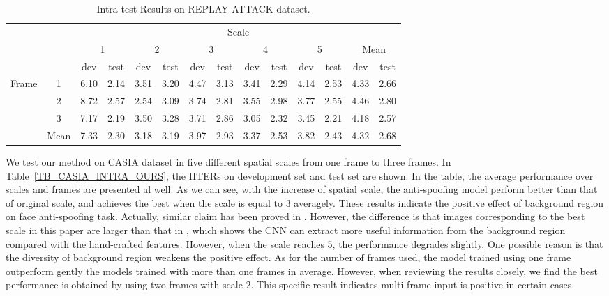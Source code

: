 \documentclass[letterpaper, 10 pt, conference]{ieeeconf}
\begin{document}
\begin{table*}[!htb]
\caption{Intra-test Results on REPLAY-ATTACK dataset.}
\label{TB_REPLAY_ATTACK_INTRA_OURS}
\centering
\begin{tabular}{|c|c|c|c|c|c|c|c|c|c|c|c||c|c|}
\cline{3-14}
\multicolumn{2}{c|}{}       & \multicolumn{12}{c|}{Scale}     \\
\cline{3-14}
\multicolumn{2}{c|}{} & \multicolumn{2}{c|}{1} & \multicolumn{2}{c|}{2} & \multicolumn{2}{c|}{3} & \multicolumn{2}{c|}{4} & \multicolumn{2}{c|}{5} &  \multicolumn{2}{c|}{Mean}\\
\cline{3-14}
\multicolumn{2}{c|}{} & dev & test & dev & test & dev & test & dev & test & dev & test & dev & test \\
\hline
\multirow{3}{*}{Frame} & 1 & 6.10 & 2.14 & 3.51 & 3.20 & 4.47 & 3.13 & 3.41 & 2.29 & 4.14 & 2.53 & 4.33 & 2.66 \\ 

                       & 2 & 8.72 & 2.57 & 2.54 & 3.09 & 3.74 & 2.81 & 3.55 & 2.98 & 3.77 & 2.55 & 4.46 & 2.80 \\ 

                       & 3 & 7.17 & 2.19 & 3.50 & 3.28 & 3.71 & 2.86 & 3.05 & 2.32 & 3.45 & 2.21 & 4.18 & 2.57 \\ 
\hline
\hline
& Mean & 7.33 & 2.30 & 3.18 & 3.19 & 3.97 & 2.93 & 3.37 & 2.53 & 3.82 & 2.43 & 4.32 & 2.68 \\
\hline
\end{tabular}
\end{table*}

We test our method on CASIA dataset in five different spatial scales from one frame to three frames. In Table~\ref{TB_CASIA_INTRA_OURS}, the HTERs on development set and test set are shown. In the table, the average performance over scales and frames are presented al well. As we can see, with the increase of spatial scale, the anti-spoofing model perform better than that of original scale, and achieves the best when the scale is equal to 3 averagely. These results indicate the positive effect of background region on face anti-spoofing task. Actually, similar claim has been proved in \cite{Face_Anti_Spoofing_JianweiYang_2013}. However, the difference is that images corresponding to the best scale in this paper are larger than that in \cite{Face_Anti_Spoofing_JianweiYang_2013}, which shows the CNN can extract more useful information from the background region compared with the hand-crafted features. However, when the scale reaches 5, the performance degrades slightly. One possible reason is that the diversity of background region weakens the positive effect. As for the number of frames used, the model trained using one frame outperform gently the models trained with more than one frames in average. However, when reviewing the results closely, we find the best performance is obtained by using two frames with scale 2. This specific result indicates multi-frame input is positive in certain cases. 
\end{document}
